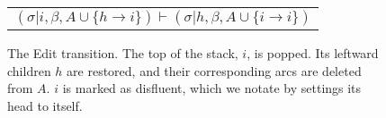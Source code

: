 \documentclass[11pt,letterpaper]{article}
\begin{document}
%
%
% 
%
\begin{figure}
    \begin{tabular}{l}
        $(\sigma | i, \beta, A \cup \{ h \rightarrow i \}) \vdash (\sigma | h, \beta, A \cup \{ i \rightarrow i \})$  \\
\end{tabular}
\caption{\small The Edit transition. The top of the stack, $i$, is popped. Its leftward
    children $h$ are restored, and their corresponding arcs are deleted from $A$.
$i$ is marked as disfluent, which we notate by settings its head to itself.\label{fig:edit_notation}}
\end{figure}
\end{document}
